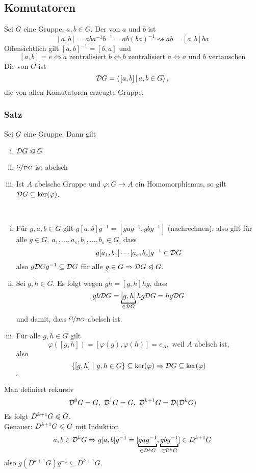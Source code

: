\subsection{Komutatoren}
\label{sub:komutatoren}
Sei $G$ eine Gruppe, $a,b\in G$. Der  von $a$ und $b$ ist 
\[ 
[a,b]=aba^{-1}b^{-1}=ab(ba)^{-1}\rightsquigarrow ab=[a,b]ba
\]
Offensichtlich gilt $[a,b]^{-1}=[b,a]$ und 
\[
[a,b]=e\Leftrightarrow a\text{ zentralisiert }b\Leftrightarrow b\text{ zentralisiert }a\Leftrightarrow a\text{ und }b\text{ vertauschen}
\]
Die  von $G$ ist
\[
\D G=\sprod{[a,b]}{a,b\in G},
\]
die von allen Komutatoren erzeugte Gruppe.

\subsubsection*{Satz}
Sei $G$ eine Gruppe. Dann gilt
\begin{enumerate}[(i)]
	\item $\mathcal{D} G\trianglelefteqslant G$
	\item $\nicefrac{G}{\mathcal{D} G}$ ist abelsch
	\item Ist $A$ abelsche Gruppe und $\varphi:G\to A$ ein Homomorphismus, so gilt $\mathcal{D} G\subseteq \ker(\varphi)$.
\end{enumerate}

\\
\begin{enumerate}[(i)]
	\item Für $g,a,b \in G$ gilt $g[a,b]g^{-1}=[gag^{-1},gbg^{-1}]$ (nachrechnen), also gilt für alle $g\in G,~a_1,\dots,a_s,b_1,\dots,b_s\in G$, dass
	\[
	g[a_1,b_1]\cdots[a_s,b_s]g^{-1}\in \mathcal{D} G
	\]
	also $g\mathcal{D} G g^{-1}\subseteq \mathcal{D} G$ für alle $g\in G\Rightarrow \mathcal{D} G\trianglelefteqslant G$.
	\item Sei $g,h\in G$. Es folgt wegen $gh=[g,h]hg$, dass
	\[
	gh\D G=\underbracket{[g,h]}_{\in \D G}hg \D G=hg\D G
	\]
	und damit, dass $\nicefrac{G}{\mathcal{D} G}$ abelsch ist.
	\item Für alle $g,h\in G$ gilt
	\[
	\varphi([g,h])=[\varphi(g),\varphi(h)]=e_A, \text{ weil $A$ abelsch ist,}
	\]
	also 
	\[
	\{[g,h]~|~g,h\in G \}\subseteq \ker(\varphi)\Rightarrow\mathcal{D} G\subseteq \ker(\varphi)
	\]
	\hfill $\square$
\end{enumerate}
Man definiert rekursiv
\[
\mathcal{D}^0 G=G,~\mathcal{D}^1 G=G,~\mathcal{D}^{k+1}G=\mathcal{D}(\mathcal{D}^kG)
\]
Es folgt $D^{k+1}G\trianglelefteqslant G$.\\
Genauer: $D^{k+1}G\trianglelefteqslant G$ mit Induktion
\[
a,b\in \D^kG\Rightarrow g[a,b]g^{-1}=[\underbracket{gag^{-1}}_{\in \D^kG},\underbracket{gbg^{-1}}_{\in \D^kG}]\in D^{k+1}G
\]
also $g(D^{k+1}G)g^{-1}\subseteq D^{k+1}G$.

